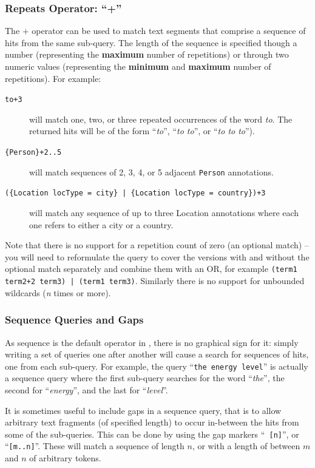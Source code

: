 \subsubsection{Repeats Operator: ``+''}\label{sec:mimir-search:kleene-query}

The $+$ operator can be used to match text segments that comprise a sequence of
hits from the same sub-query. The length of the sequence is specified though a
number (representing the {\bf maximum} number of repetitions) or through two
numeric values (representing the {\bf minimum} and {\bf maximum} number of
repetitions). For example:
\begin{description}
  \item[{\tt to+3}] will match one, two, or three repeated occurrences of the
  word {\it to}. The returned hits will be of the form ``{\it to}'', ``{\it to  
  to}'', or ``{\it to to to}'').
  \item[{\tt \{Person\}+2..5}] will match sequences of 2, 3, 4, or 5
  adjacent {\tt Person} annotations.
  \item[{\tt (\{Location locType = city\} |
  \{Location locType = country\})+3}] will match any sequence of up to
  three Location annotations where each one refers to either a city or a
  country.
\end{description}

Note that there is no support for a repetition count of zero (an optional
match) -- you will need to reformulate the query to cover the versions with and
without the optional match separately and combine them with an OR, for example
{\tt (term1 term2+2 term3) | (term1 term3)}.  Similarly there is no support for
unbounded wildcards ({\em n} times or more).

\subsubsection{Sequence Queries and Gaps}\label{sec:mimir-search:sequence-query}

As sequence is the default operator in \Mimir, there is no graphical sign for
it: simply writing a set of queries one after another will cause a search for
sequences of hits, one from each sub-query. For example, the query ``{\tt the
energy level}'' is actually a sequence query where the first sub-query searches
for the word ``{\it the}'', the second for ``{\it energy}'', and the last for
``{\it level}''.

It is sometimes useful to include gaps in a sequence query, that is to allow
arbitrary text fragments (of specified length) to occur in-between the hits
from some of the sub-queries. This can be done by using the gap markers ``{\tt
[n]}'', or ``{\tt [m..n]}''. These will match a sequence of length $n$, or with
a length of between $m$ and $n$ of arbitrary tokens.

